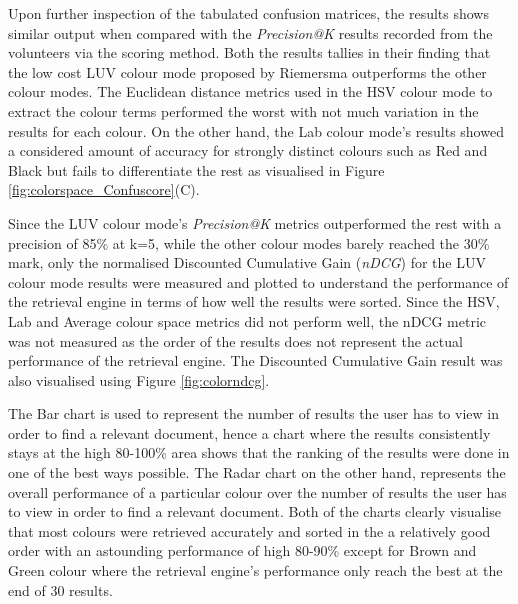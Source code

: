 Upon further inspection of the tabulated confusion matrices, the results shows similar output when compared with the \textit{Precision@K} results recorded from the volunteers via the scoring method. Both the results tallies in their finding that the low cost LUV colour mode proposed by Riemersma\cite{riemersma} outperforms the other colour modes. The Euclidean distance metrics used in the HSV colour mode to extract the colour terms performed the worst with not much variation in the results for each colour. On the other hand, the Lab colour mode's results showed a considered amount of accuracy for strongly distinct colours such as Red and Black but fails to differentiate the rest as visualised in Figure \ref{fig:colorspace_Confuscore}(C).

Since the LUV colour mode's \textit{Precision@K} metrics outperformed the rest with a precision of 85\% at k=5, while the other colour modes barely reached the 30\% mark, only the normalised Discounted Cumulative Gain (\textit{nDCG}) for the LUV colour mode results were measured and plotted to understand the performance of the retrieval engine in terms of how well the results were sorted. Since the HSV, Lab and Average colour space metrics did not perform well, the nDCG metric was not measured as the order of the results does not represent the actual performance of the retrieval engine. The Discounted Cumulative Gain result was also visualised using Figure \ref{fig:colorndcg}.

The Bar chart is used to represent the number of results the user has to view in order to find a relevant document, hence a chart where the results consistently stays at the high 80-100\% area shows that the ranking of the results were done in one of the best ways possible. The Radar chart on the other hand, represents the overall performance of a particular colour over the number of results the user has to view in order to find a relevant document. Both of the charts clearly visualise that most colours were retrieved accurately and sorted in the a relatively good order with an astounding performance of high 80-90\% except for Brown and Green colour where the retrieval engine's performance only reach the best at the end of 30 results.


